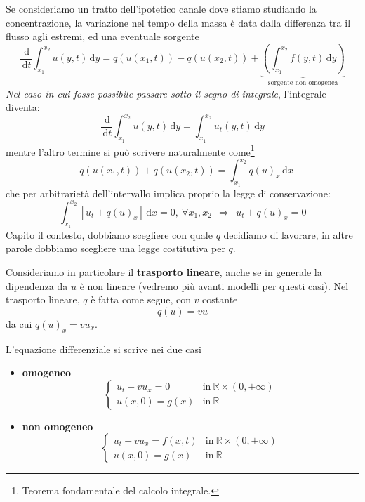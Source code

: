 \documentclass[10pt,a4paper,twoside,openright]{book}
\newcommand{\de}{\,\mathrm d}
\newcommand{\dx}{\de x}
\newcommand{\dy}{\de y}
\newcommand{\dt}{\de t}
\begin{document}
Se consideriamo un tratto dell'ipotetico canale dove stiamo studiando la concentrazione, la variazione nel tempo della massa è data dalla differenza tra il flusso agli estremi, ed una eventuale sorgente
\begin{equation*}
    \frac{\de}{\dt}\int ^{x_{2}}_{x_{1}} u(y,t) \dy=q(u(x_{1} ,t)) -q(u(x_{2} ,t)) +\underbrace{\left(\int ^{x_{2}}_{x_{1}} f(y,t) \dy\right)}_{\text{sorgente non omogenea}}
\end{equation*}
\emph{Nel caso in cui fosse possibile passare sotto il segno di integrale}, l'integrale diventa:
\begin{equation}
    \frac{\de}{\dt}\int ^{x_{2}}_{x_{1}} u(y,t) \dy=\int ^{x_{2}}_{x_{1}} u_{t}(y,t) \dy
    \label{eq:lc-passaggio-derivata-integrale}
\end{equation}
mentre l'altro termine si può scrivere naturalmente come\footnote{Teorema fondamentale del calcolo integrale.}
\begin{equation*}
    -q(u(x_{1} ,t)) +q(u(x_{2} ,t)) =\int ^{x_{2}}_{x_{1}} q(u)_{x} \dx
\end{equation*}
che per arbitrarietà dell'intervallo implica proprio la legge di conservazione:
\begin{equation*}
    \int ^{x_{2}}_{x_{1}}[ u_{t} +q(u)_{x}] \dx=0,\ \forall x_{1} ,x_{2} \ \ \Rightarrow \ \ u_{t} +q(u)_{x} =0
\end{equation*}
Capito il contesto, dobbiamo scegliere con quale $q$ decidiamo di lavorare, in altre parole dobbiamo scegliere una legge costitutiva per $q$.

Consideriamo in particolare il \textbf{trasporto lineare}, anche se in generale la dipendenza da $u$ è non lineare (vedremo più avanti modelli per questi casi). Nel trasporto lineare, $q$ è fatta come segue, con $v$ costante
\begin{equation}
    q(u) =vu
\end{equation}
da cui $q(u)_{x} =vu_{x}$.

L'equazione differenziale si scrive nei due casi
\begin{itemize}
    \item \textbf{omogeneo}
          \begin{equation*}
              \begin{cases}
                  u_{t} +vu_{x} =\boxed{0} & \text{in} \ \mathbb{R} \times (0,+\infty) \\
                  u(x,0) =g(x)             & \text{in} \ \mathbb{R}
              \end{cases}
          \end{equation*}
    \item \textbf{non omogeneo}
          \begin{equation*}
              \begin{cases}
                  u_{t} +vu_{x} =\boxed{f(x,t)} & \text{in} \ \mathbb{R} \times (0,+\infty) \\
                  u(x,0) =g(x)                  & \text{in} \ \mathbb{R}
              \end{cases}
          \end{equation*}
\end{itemize}
\end{document}
